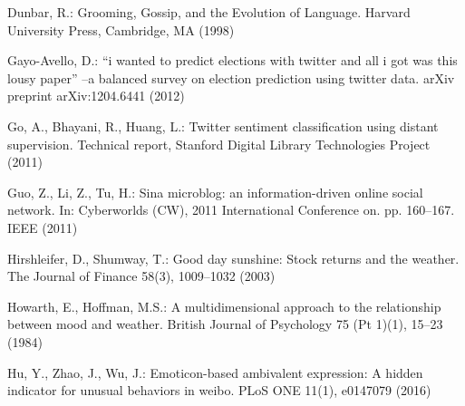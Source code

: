 \documentclass[aps,preprint,groupedaddress]{revtex4-1}
\begin{document}
\begin{thebibliography}{10}
Dunbar, R.: Grooming, Gossip, and the Evolution of Language. Harvard University
  Press, Cambridge, MA (1998)

{\color{black}{Ekman, P., Friesen, W.V., Ellsworth, P.: Emotion in the human face: Guidelines
  for research and an integration of findings. Elsevier (2013)}}

Gayo-Avello, D.: ``i wanted to predict elections with twitter and all i got was
  this lousy paper'' --a balanced survey on election prediction using twitter
  data. arXiv preprint arXiv:1204.6441  (2012)

Go, A., Bhayani, R., Huang, L.: Twitter sentiment classification using distant
  supervision. Technical report, Stanford Digital Library Technologies Project
  (2011)

Guo, Z., Li, Z., Tu, H.: Sina microblog: an information-driven online social
  network. In: Cyberworlds (CW), 2011 International Conference on. pp.
  160--167. IEEE (2011)

{\color{black}{Hardle, W., Marron, J.: Bootstrap simultaneous error bars for nonparametric
  regression. The Annals of Statistics pp. 778--796 (1991)}}

Hirshleifer, D., Shumway, T.: Good day sunshine: Stock returns and the weather.
  The Journal of Finance  58(3),  1009--1032 (2003)

Howarth, E., Hoffman, M.S.: A multidimensional approach to the relationship
  between mood and weather. British Journal of Psychology  75 (Pt 1)(1),
  15--23 (1984)

Hu, Y., Zhao, J., Wu, J.: Emoticon-based ambivalent expression: A hidden
  indicator for unusual behaviors in weibo. PLoS ONE  11(1),  e0147079 (2016)

{\color{black}{Kara, Y., Boyacioglu, M.A., Baykan, O.K.: Predicting direction of stock price
  index movement using artificial neural networks and support vector machines:
  The sample of the istanbul stock exchange. Expert Systems with Applications
  38(5),  5311 -- 5319 (2011)}}

{\color{black}{Kim, K.j.: Financial time series forecasting using support vector machines.
  Neurocomputing  55(1),  307--319 (2003)}}

{\color{black}{Krauss, C., Do, X.A., Huck, N.: Deep neural networks, gradient-boosted trees,
  random forests: Statistical arbitrage on the s\&p 500. European Journal of
  Operational Research  259(2),  689--702 (2017)}}


\end{thebibliography}
\end{document}
